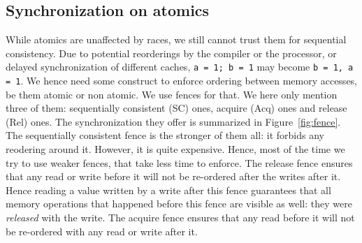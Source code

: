 \subsection{Synchronization on atomics}
While atomics are unaffected by races, we still cannot trust them for sequential consistency. Due to potential reorderings by the compiler or the processor, or delayed synchronization of different caches, \texttt{a = 1; b = 1} may become \texttt{b = 1, a = 1}. We hence need some construct to enforce ordering between memory accesses, be them atomic or non atomic. We use fences for that. We here only mention three of them: sequentially consistent (SC) ones, acquire (Acq) ones and release (Rel) ones. The synchronization they offer is summarized in Figure~\ref{fig:fence}. The sequentially consistent fence is the stronger of them all: it forbids any reodering around it. However, it is quite expensive. Hence, most of the time we try to use weaker fences, that take less time to enforce. The release fence ensures that any read or write before it will not be re-ordered after the writes after it. Hence reading a value written by a write after this fence guarantees that all memory operations that happened before this fence are visible as well: they were \emph{released} with the write. The acquire fence ensures that any read before it will not be re-ordered with any read or write after it.

